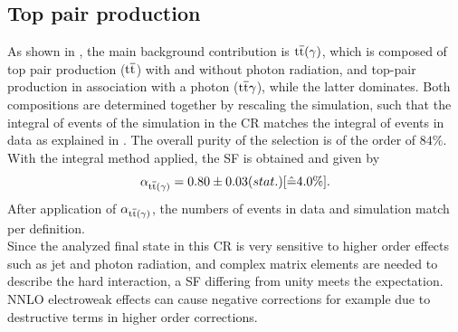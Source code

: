 \subsection{Top pair production}\label{sec:ttbar}
As shown in , the main background contribution is ${\mathrm{t}\overline{\mathrm{t}}}(\gamma)$, which is composed of top pair production (${\mathrm{t}\overline{\mathrm{t}}}$) with and without photon radiation, and top-pair production in association with a photon (${\mathrm{t}\overline{\mathrm{t}}}\gamma$), while the latter dominates. Both compositions are determined together by rescaling the simulation, such that the integral of events of the simulation in the CR matches the integral of events in data as explained in . The overall purity of the selection is of the order of $84\%$.
%
With the integral method applied, the SF is obtained and given by
\begin{equation}\label{eq:AlphaTT}
 \alpha_{{\mathrm{t}\overline{\mathrm{t}}}(\gamma)}=0.80 \pm 0.03 (stat.) [\hat{=}4.0\%].
\end{equation}
After application of $\alpha_{{\mathrm{t}\overline{\mathrm{t}}}(\gamma)}$, the numbers of events in data and simulation match per definition.\\
Since the analyzed final state in this CR is very sensitive to higher order effects such as jet and photon radiation, and complex matrix elements are needed to describe the hard interaction, a SF differing from unity meets the expectation. NNLO electroweak effects can cause negative corrections for example due to destructive terms in higher order corrections.
